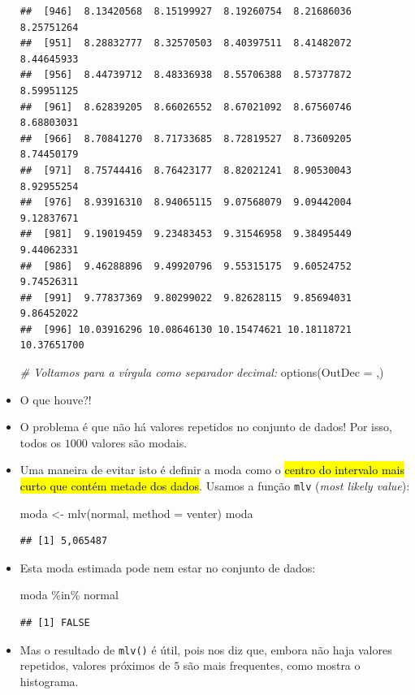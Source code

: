 \documentclass[
  11pt]{report}
\newenvironment{Shaded}{\begin{snugshade}}{\end{snugshade}}
\newcommand{\AttributeTok}[1]{\textcolor[rgb]{0.77,0.63,0.00}{#1}}
\newcommand{\CommentTok}[1]{\textcolor[rgb]{0.56,0.35,0.01}{\textit{#1}}}
\newcommand{\FunctionTok}[1]{\textcolor[rgb]{0.00,0.00,0.00}{#1}}
\newcommand{\NormalTok}[1]{#1}
\newcommand{\OtherTok}[1]{\textcolor[rgb]{0.56,0.35,0.01}{#1}}
\newcommand{\SpecialCharTok}[1]{\textcolor[rgb]{0.00,0.00,0.00}{#1}}
\newcommand{\StringTok}[1]{\textcolor[rgb]{0.31,0.60,0.02}{#1}}
\renewenvironment{Shaded}{
    \begin{mdframed}[%
      roundcorner=2pt,%
      innerleftmargin=5pt,%
      innerrightmargin=5pt,%
      topline=true,%
      leftline=true,%
      rightline=true,%
      bottomline=true,%
      linewidth=0.5pt,%
      linecolor=black!20,%
      backgroundcolor=black!2,%
      skipabove=2ex,%
      skipbelow=2.5ex%
    ]%
  }
  {
    \end{mdframed}
  }
\begin{document}
\begin{itemize}
\begin{verbatim}
##  [946]  8.13420568  8.15199927  8.19260754  8.21686036  8.25751264
##  [951]  8.28832777  8.32570503  8.40397511  8.41482072  8.44645933
##  [956]  8.44739712  8.48336938  8.55706388  8.57377872  8.59951125
##  [961]  8.62839205  8.66026552  8.67021092  8.67560746  8.68803031
##  [966]  8.70841270  8.71733685  8.72819527  8.73609205  8.74450179
##  [971]  8.75744416  8.76423177  8.82021241  8.90530043  8.92955254
##  [976]  8.93916310  8.94065115  9.07568079  9.09442004  9.12837671
##  [981]  9.19019459  9.23483453  9.31546958  9.38495449  9.44062331
##  [986]  9.46288896  9.49920796  9.55315175  9.60524752  9.74526311
##  [991]  9.77837369  9.80299022  9.82628115  9.85694031  9.86452022
##  [996] 10.03916296 10.08646130 10.15474621 10.18118721 10.37651700
\end{verbatim}

\begin{Shaded}
\begin{Highlighting}[]
\CommentTok{\# Voltamos para a vírgula como separador decimal:}
\FunctionTok{options}\NormalTok{(}\AttributeTok{OutDec =} \StringTok{\textquotesingle{},\textquotesingle{}}\NormalTok{)}
\end{Highlighting}
\end{Shaded}
\item
  O que houve?!
\item
  O problema é que não há valores repetidos no conjunto de dados! Por isso, todos os $1000$ valores são modais.
\item
  Uma maneira de evitar isto é definir a moda como o {\hl{centro do intervalo mais curto que contém metade dos dados}}. Usamos a função \texttt{mlv} (\emph{most likely value}):

\begin{Shaded}
\begin{Highlighting}[]
\NormalTok{moda }\OtherTok{\textless{}{-}} \FunctionTok{mlv}\NormalTok{(normal, }\AttributeTok{method =} \StringTok{\textquotesingle{}venter\textquotesingle{}}\NormalTok{)}
\NormalTok{moda}
\end{Highlighting}
\end{Shaded}

\begin{verbatim}
## [1] 5,065487
\end{verbatim}
\item
  Esta moda estimada pode nem estar no conjunto de dados:

\begin{Shaded}
\begin{Highlighting}[]
\NormalTok{moda }\SpecialCharTok{\%in\%}\NormalTok{ normal}
\end{Highlighting}
\end{Shaded}

\begin{verbatim}
## [1] FALSE
\end{verbatim}
\item
  Mas o resultado de \texttt{mlv()} é útil, pois nos diz que, embora não haja valores repetidos, valores próximos de $5$ são mais frequentes, como mostra o histograma.
\end{itemize}
\end{document}
